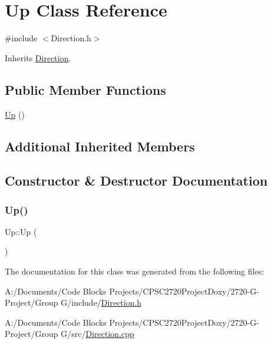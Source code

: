 \hypertarget{class_up}{}\section{Up Class Reference}
\label{class_up}


{\ttfamily \#include $<$Direction.\+h$>$}



Inherits \mbox{\hyperlink{class_direction}{Direction}}.

\subsection*{Public Member Functions}
\begin{DoxyCompactItemize}
\item 
\mbox{\hyperlink{class_up_a180a2c51949e082e63f135ffb0dfdaa7}{Up}} ()
\end{DoxyCompactItemize}
\subsection*{Additional Inherited Members}


\subsection{Constructor \& Destructor Documentation}
\mbox{\label{class_up_a180a2c51949e082e63f135ffb0dfdaa7}} 
\subsubsection{\texorpdfstring{Up()}{Up()}}
{\footnotesize\ttfamily Up\+::\+Up (\begin{DoxyParamCaption}{ }\end{DoxyParamCaption})}



The documentation for this class was generated from the following files\+:\begin{DoxyCompactItemize}
\item 
A\+:/\+Documents/\+Code Blocks Projects/\+C\+P\+S\+C2720\+Project\+Doxy/2720-\/\+G-\/\+Project/\+Group G/include/\mbox{\hyperlink{_direction_8h}{Direction.\+h}}\item 
A\+:/\+Documents/\+Code Blocks Projects/\+C\+P\+S\+C2720\+Project\+Doxy/2720-\/\+G-\/\+Project/\+Group G/src/\mbox{\hyperlink{_direction_8cpp}{Direction.\+cpp}}\end{DoxyCompactItemize}
